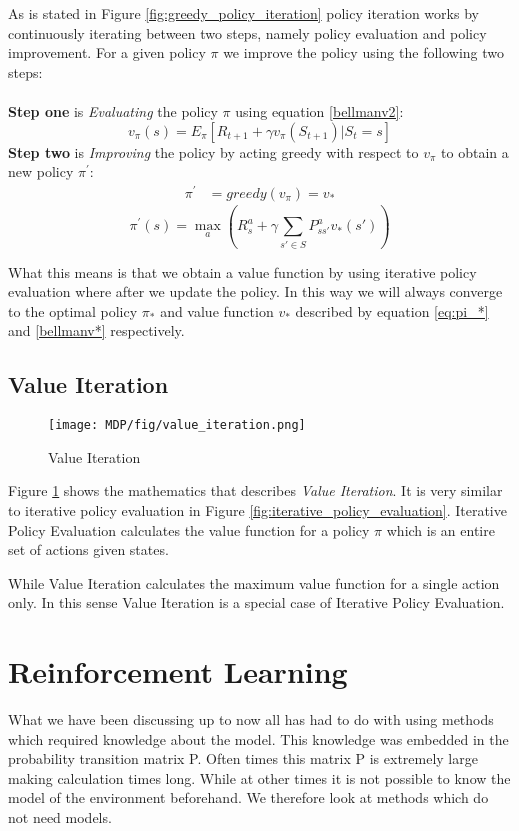 As is stated in Figure \ref{fig:greedy_policy_iteration} policy iteration works by continuously iterating between two steps, namely policy evaluation and policy improvement.
For a given policy $\pi$ we improve the policy using the following two steps:\\\\
\textbf{Step one} is \textit{Evaluating} the policy $\pi$ using equation \ref{bellmanv2}: \[v_{\pi}(s) = E_{\pi}[R_{t+1} + \gamma v_{\pi}(S_{t+1})|S_t = s]\]
\textbf{Step two} is \textit{Improving} the policy by acting greedy with respect to $v_\pi$ to obtain a new policy $\pi^{'}$:
\begin{align}
	\pi^{'} &= greedy(v_{\pi})= v_{*}
	\label{pi'}
\end{align}
\[\pi^{'}(s) = \max\limits_{a}(R^{a}_s+\gamma\sum_{s'\in S}P^{a}_{ss'}v_*(s'))\]

What this means is that we obtain a value function by using iterative policy evaluation where after we update the policy. In this way we will always converge to the optimal policy $\pi_{*}$ and value function $v_{*}$ described by equation \ref{eq:pi_*} and \ref{bellmanv*} respectively.
\subsection{Value Iteration}
\begin{figure}[!htb]
	\centering
	\texttt{[image: MDP/fig/value\_iteration.png]}
	\caption{Value Iteration\cite{David_Silver}}
	\label{fig:value_iteration}
\end{figure}
Figure \ref{fig:value_iteration} shows the mathematics that describes \textit{Value Iteration}. It is very similar to iterative policy evaluation in Figure \ref{fig:iterative_policy_evaluation}. Iterative Policy Evaluation calculates the value function for a policy $\pi$ which is an entire set of actions given states.

While Value Iteration calculates the maximum value function for a single action only. In this sense Value Iteration is a special case of Iterative Policy Evaluation.

\section{Reinforcement Learning}
What we have been discussing up to now all has had to do with using methods which required knowledge about the model. This knowledge was embedded in the probability transition matrix P. Often times this matrix P is extremely large making calculation times long. While at other times it is not possible to know the model of the environment beforehand. We therefore look at methods which do not need models.

